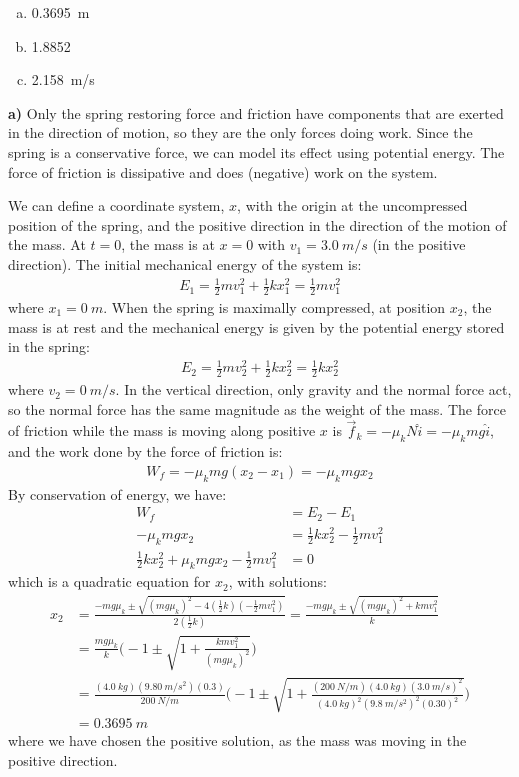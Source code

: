 \begin{finalanswer}
\begin{enumerate}[(a)]
\item \SI{0.3695}{m}
\item 1.8852
\item \SI{2.158}{m/s}
\end{enumerate}
\end{finalanswer}
\begin{solution}
\textbf{a)} Only the spring restoring force and friction have components that are exerted in the direction of motion, so they are the only forces doing work. Since the spring is a conservative force, we can model its effect using potential energy. The force of friction is dissipative and does (negative) work on the system. 

We can define a coordinate system, $x$, with the origin at the uncompressed position of the spring, and the positive direction in the direction of the motion of the mass. At $t=0$, the mass is at $x=0$ with $v_1=\SI{3.0}{m/s}$ (in the positive direction). The initial mechanical energy of the system is:
\begin{align*}
E_1=\frac{1}{2}mv_1^2+\frac{1}{2}kx_1^2=\frac{1}{2}mv_1^2
\end{align*}
where $x_1=\SI{0}{m}$. When the spring is maximally compressed, at position $x_2$, the mass is at rest and the mechanical energy is given by the potential energy stored in the spring:
\begin{align*}
E_2=\frac{1}{2}mv_2^2+\frac{1}{2}kx_2^2=\frac{1}{2}kx_2^2
\end{align*}
where $v_2=\SI{0}{m/s}$. In the vertical direction, only gravity and the normal force act, so the normal force has the same magnitude as the weight of the mass. The force of friction while the mass is moving along positive $x$ is $\vec f_k=-\mu_kN\hat i=-\mu_kmg\hat i$, and the work done by the force of friction is:
\begin{align*}
W_f=-\mu_kmg(x_2-x_1)=-\mu_kmgx_2
\end{align*}
By conservation of energy, we have:
\begin{align*}
W_f &= E_2 - E_1\\
-\mu_kmgx_2 &= \frac{1}{2}kx_2^2-\frac{1}{2}mv_1^2\\
\frac{1}{2}kx_2^2+\mu_kmgx_2-\frac{1}{2}mv_1^2&=0
\end{align*}
which is a quadratic equation for $x_2$, with solutions:
\begin{align*}
x_2&=\frac{-mg\mu_k\pm\sqrt{(mg\mu_k)^2-4(\frac{1}{2}k)(-\frac{1}{2}mv^2_1)}}{2(\frac{1}{2}k)}=\frac{-mg\mu_k\pm\sqrt{(mg\mu_k)^2+kmv^{2}_1}}{k}\\
&=\frac{mg\mu_k}{k}\Bigg(-1\pm\sqrt{1+\frac{kmv^{2}_1}{(mg\mu_k)^2}}\Bigg)\\
&=\frac{(\SI{4.0}{kg})(\SI{9.80}{m/s^2})(0.3)}{\SI{200}{N/m}}\Bigg(-1\pm\sqrt{1+\frac{(\SI{200}{N/m})(\SI{4.0}{kg})(\SI{3.0}{m/s})^2}{(\SI{4.0}{kg})^2(\SI{9.8}{m/s^2})^2(0.30)^2}}\Bigg)\\
&=\SI{0.3695}{m}
\end{align*}
where we have chosen the positive solution, as the mass was moving in the positive direction.


\end{solution}
